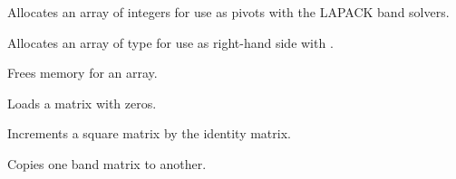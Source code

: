 \documentclass[letterpaper,10pt,english]{sphinxmanual}
\begin{document}

\begin{fulllineitems}
Allocates an array of  integers for use as pivots with the
LAPACK band solvers.

\end{fulllineitems}


\begin{fulllineitems}
Allocates an array of type  for use as right-hand side
with .

\end{fulllineitems}


\begin{fulllineitems}
Frees memory for an array.

\end{fulllineitems}


\begin{fulllineitems}
Loads a matrix with zeros.

\end{fulllineitems}


\begin{fulllineitems}
Increments a square matrix by the identity matrix.

\end{fulllineitems}


\begin{fulllineitems}
\label{linear_solvers/DLS:BandCopy}
Copies one band matrix to another.

\end{fulllineitems}
\end{document}
